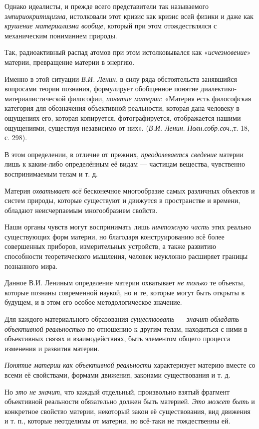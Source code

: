 \documentclass[a4paper,14pt,russian]{extreport}
\begin{document}
Однако идеалисты, и прежде всего представители так называемого \emph{эмпириокритицизма}, истолковали этот кризис как кризис всей физики и даже как \emph{крушение материализма вообще}, который при этом отождествлялся с механическим пониманием природы.

Так, радиоактивный распад атомов при этом истолковывался как «\emph{исчезновение}» материи, превращение материи в энергию.

Именно в этой ситуации \emph{В.И. Ленин}, в силу ряда обстоятельств занявшийся вопросами теории познания, формулирует обобщенное понятие диалектико-материалистической философии, \emph{понятие материи}: «Материя есть философская категория для обозначения объективной реальности, которая дана человеку в ощущениях его, которая копируется, фотографируется, отображается нашими ощущениями, существуя независимо от них». (\emph{В.И. Ленин}. \emph{Полн.собр.соч}.,т. 18, с. 298).

В этом определении, в отличие от прежних, \emph{преодолевается сведение} материи лишь к каким-либо определённым её видам --- частицам вещества, чувственно воспринимаемым телам и т. д.

Материя \emph{охватывает всё} бесконечное многообразие самых различных объектов и систем природы, которые существуют и движутся в пространстве и времени, обладают неисчерпаемым многообразием свойств.

Наши органы чувств могут воспринимать лишь \emph{ничтожную часть} этих реально существующих форм материи, но благодаря конструированию всё более совершенных приборов, измерительных устройств, а также развитию способности теоретического мышления, человек неуклонно расширяет границы познанного мира.

Данное В.И. Лениным определение материи охватывает \emph{не только} те объекты, которые познаны современной наукой, но и те, которые могут быть открыты в будущем, и в этом его особое методологическое значение.

Для каждого материального образования \emph{существовать --- значит обладать объективной реальностью} по отношению к другим телам, находиться с ними в объективных связях и взаимодействиях, быть элементом общего процесса изменения и развития материи.

\emph{Понятие материи как объективной реальности} характеризует материю вместе со всеми её свойствами, формами движения, законами существования и т. д.

Но \emph{это не значит}, что каждый отдельный, произвольно взятый фрагмент объективной реальности обязательно должен быть материей. \emph{Это может быть} и конкретное свойство материи, некоторый закон её существования, вид движения и т. п., которые неотделимы от материи, но всё-таки не тождественны ей.
\end{document}
